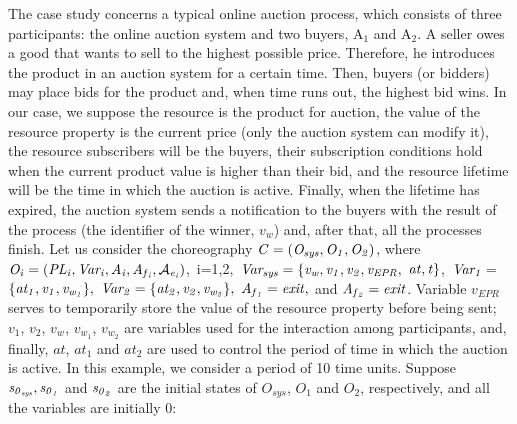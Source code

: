 The case study concerns a typical online auction process, which consists of three participants:
the online auction system and two buyers, A$_1$ and A$_2$. A seller owes a good that wants to sell to the highest possible price. Therefore, he introduces the product
in an auction system for a certain time. Then, buyers (or bidders) may place bids for the product and, when time runs out, the highest bid wins. In our case, we suppose the resource is the product for auction, the value of the resource property is the current price (only the auction system can modify it), the resource subscribers will be the buyers, their subscription conditions hold when the current product value is higher than their bid, and the resource lifetime will be the time in which the auction is active. Finally, when the lifetime has expired, the auction system sends a notification to the buyers with the result of the process (the identifier of the winner, $v_w$) and, after that, all the processes finish. Let us consider the choreography ${\it C=(O_{sys},O_1,O_2)}$, where 
${\it O_i=(PL_i,Var_i,A_i,A_{f{_i}},\mathcal{A}_{e{_i}})}$,~i=1,2,~${\it Var_{sys}=\{v_w,v_1,v_2,v_{EPR},}$
${\it at,t\}}$,~${\it Var_1= }$ \\ ${\it \{at_1,v_1,v_{w{_1}}\},\ Var_2=\{at_2,v_2,v_{w_{2}}\},\ A_{f{_1}}=exit,}$ and
${\it A_{f{_2}}=exit}$. Variable $v_{EPR}$ serves to temporarily store the value of the resource property before being sent; $v_1$, $v_2$, $v_{w_{}}$, $v_{w_{1}}$, $v_{w_{2}}$ are variables used for the interaction among participants, and, finally, $at$, $at_1$ and $at_2$ are used to control the period of time in which the auction is active. In this example, we consider a period of 10 time units. Suppose ${\it s_{0{_{sys}}}, s_{0{_1}}}$ and ${\it s_{0{_2}}}$ are the initial states of $O_{sys}$, $O_1$ and $O_2$, respectively, and all the variables are initially $0$: \\[-0.2cm]


